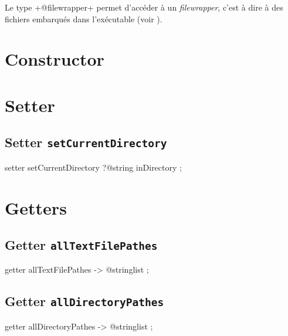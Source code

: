 



Le type \ggsq+@filewrapper+ permet d'accéder à un \emph{filewrapper}, c'est à dire à des fichiers embarqués dans l'exécutable (voir ).

\section{Constructor}

\section{Setter}

\subsection{Setter \texttt{setCurrentDirectory}}

\begin{galgas4}
setter setCurrentDirectory ?@string inDirectory ;
\end{galgas4}


\section{Getters}




\subsection{Getter \texttt{allTextFilePathes}}

\begin{galgas4}
getter allTextFilePathes -> @stringlist ;
\end{galgas4}






\subsection{Getter \texttt{allDirectoryPathes}}

\begin{galgas4}
getter allDirectoryPathes -> @stringlist ;
\end{galgas4}






